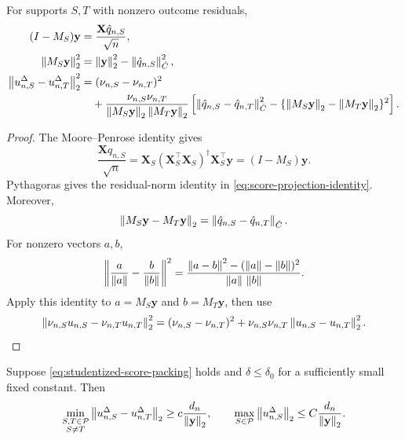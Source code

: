 \begin{lemma}
\label{lem:studentized-score-direction}
For supports $S,T$ with nonzero outcome residuals,
\begin{align}
        (I-M_S)\mathbf y&=\frac{\mathbf X\hat q_{n,S}}{\sqrt n}, \notag\\
        \left\lVert M_S\mathbf y\right\rVert_2^2
        &=\left\lVert \mathbf y\right\rVert_2^2-\left\lVert \hat q_{n,S}\right\rVert_{\hat C}^2,
        \label{eq:score-projection-identity}\\
 \left\lVert u_{n,S}^{\Delta}-u_{n,T}^{\Delta}\right\rVert_2^2
 &= (\nu_{n,S}-\nu_{n,T})^2 \notag\\
 &\quad+\frac{\nu_{n,S}\nu_{n,T}}
 {\left\lVert M_S\mathbf y\right\rVert_2\left\lVert M_T\mathbf y\right\rVert_2}
 \left[
 \left\lVert \hat q_{n,S}-\hat q_{n,T}\right\rVert_{\hat C}^2
 -\{\left\lVert M_S\mathbf y\right\rVert_2-\left\lVert M_T\mathbf y\right\rVert_2\}^2
 \right].
 \label{eq:studentized-score-direction-bridge}
\end{align}
\end{lemma}

\begin{proof}
The Moore--Penrose identity gives
\[
        \frac{\mathbf X\hat q_{n,S}}{\sqrt n}
        =\mathbf X_S(\mathbf X_S^\top\mathbf X_S)^\dagger
        \mathbf X_S^\top\mathbf y=(I-M_S)\mathbf y.
\]
Pythagoras gives the residual-norm identity in
\eqref{eq:score-projection-identity}.  Moreover,
\[
        \left\lVert M_S\mathbf y-M_T\mathbf y\right\rVert_2
        =\left\lVert \hat q_{n,S}-\hat q_{n,T}\right\rVert_{\hat C}.
\]
For nonzero vectors $a,b$,
\[
 \left\|\frac a{\left\lVert a\right\rVert}-\frac b{\left\lVert b\right\rVert}\right\|^2
 =\frac{\left\lVert a-b\right\rVert^2-(\left\lVert a\right\rVert-\left\lVert b\right\rVert)^2}
 {\left\lVert a\right\rVert\,\left\lVert b\right\rVert}.
\]
Apply this identity to $a=M_S\mathbf y$ and $b=M_T\mathbf y$, then use
\[
 \left\lVert \nu_{n,S}u_{n,S}-\nu_{n,T}u_{n,T}\right\rVert_2^2
 =(\nu_{n,S}-\nu_{n,T})^2
 +\nu_{n,S}\nu_{n,T}\left\lVert u_{n,S}-u_{n,T}\right\rVert_2^2.\qedhere
\]
\end{proof}

\begin{lemma}
\label{lem:score-direction-packing}
Suppose \eqref{eq:studentized-score-packing} holds and
$\delta\le\delta_0$ for a sufficiently small fixed constant.  Then
\begin{equation}\label{eq:studentized-direction-packing}
 \min_{\substack{S,T\in\mathcal P\\S\ne T}}
 \left\lVert u_{n,S}^{\Delta}-u_{n,T}^{\Delta}\right\rVert_2
 \ge c\frac{d_n}{\left\lVert \mathbf y\right\rVert_2},
 \qquad
 \max_{S\in\mathcal P}\left\lVert u_{n,S}^{\Delta}\right\rVert_2
 \le C\frac{d_n}{\left\lVert \mathbf y\right\rVert_2}.
\end{equation}
\end{lemma}

